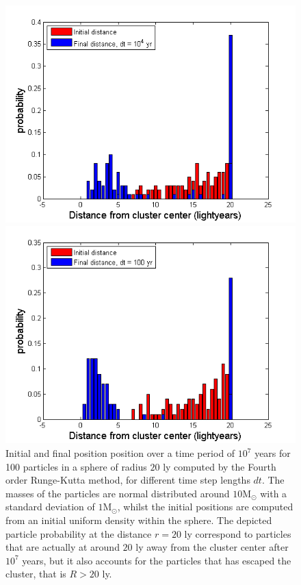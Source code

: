 \begin{figure}[H]
\begin{minipage}{.5\textwidth}
  \includegraphics[width=1\linewidth]{Figures/graphs_RK4/pos4.png}
\end{minipage}%
\begin{minipage}{.5\textwidth}
  \centering
  \includegraphics[width=1\linewidth]{Figures/graphs_RK4/pos9.png}
\end{minipage}
\caption{
Initial and final position position over a time period of $10^7$ years for 100 particles in a sphere of radius $20$ ly computed by the Fourth order Runge-Kutta method, for different time step lengths $dt$.
The masses of the particles are normal distributed around $10{\textrm{M}}_{\odot}$ with a standard deviation of $1{\textrm{M}}_{\odot}$, whilst the initial positions are computed from an initial uniform density within the sphere.
The depicted particle probability at the distance $r=20$ ly correspond to particles that are actually at around $20$ ly away from the cluster center after $10^7$ years, but it also accounts for the particles that has escaped the cluster, that is $R>20$ ly.
}
\label{fig:histograms_RK4_diff_time_step}
\end{figure}

